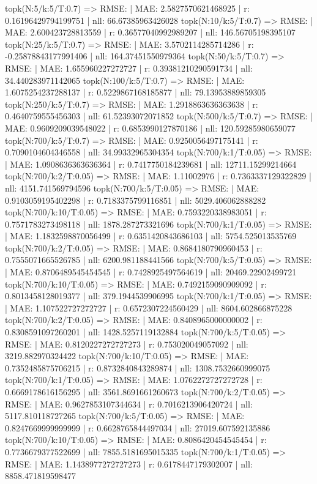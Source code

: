 topk(N:5/k:5/T:0.7) => RMSE: | MAE: 2.5827570621468925 | r: 0.16196429794199751 | nll: 66.67385963426028
topk(N:10/k:5/T:0.7) => RMSE: | MAE: 2.600423728813559 | r: 0.36577040992989207 | nll: 146.56705198395107
topk(N:25/k:5/T:0.7) => RMSE: | MAE: 3.5702114285714286 | r: -0.25878843177991406 | nll: 164.37451550979364
topk(N:50/k:5/T:0.7) => RMSE: | MAE: 1.655960227272727 | r: 0.39381210290591734 | nll: 34.440283971142065
topk(N:100/k:5/T:0.7) => RMSE: | MAE: 1.6075254237288137 | r: 0.5229867168185877 | nll: 79.13953889859305
topk(N:250/k:5/T:0.7) => RMSE: | MAE: 1.2918863636363638 | r: 0.4640759555456303 | nll: 61.52393072071852
topk(N:500/k:5/T:0.7) => RMSE: | MAE: 0.9609209039548022 | r: 0.6853990127870186 | nll: 120.59285980659077
topk(N:700/k:5/T:0.7) => RMSE: | MAE: 0.9250056497175141 | r: 0.7090104604346558 | nll: 34.99332965304354
topk(N:700/k:1/T:0.05) => RMSE: | MAE: 1.0908636363636364 | r: 0.7417750184239681 | nll: 12711.15299214664
topk(N:700/k:2/T:0.05) => RMSE: | MAE: 1.11002976 | r: 0.7363337129322829 | nll: 4151.741569794596
topk(N:700/k:5/T:0.05) => RMSE: | MAE: 0.9103059195402298 | r: 0.7183375799116851 | nll: 5029.406062888282
topk(N:700/k:10/T:0.05) => RMSE: | MAE: 0.7593220338983051 | r: 0.7571783273498118 | nll: 1878.287273321696
topk(N:700/k:1/T:0.05) => RMSE: | MAE: 1.1832598870056499 | r: 0.6351420843686103 | nll: 5754.525013535769
topk(N:700/k:2/T:0.05) => RMSE: | MAE: 0.8684180790960453 | r: 0.7555071665526785 | nll: 6200.981188441566
topk(N:700/k:5/T:0.05) => RMSE: | MAE: 0.8706489545454545 | r: 0.7428925497564619 | nll: 20469.22902499721
topk(N:700/k:10/T:0.05) => RMSE: | MAE: 0.7492159090909092 | r: 0.8013458128019377 | nll: 379.1944539906995
topk(N:700/k:1/T:0.05) => RMSE: | MAE: 1.107522727272727 | r: 0.6572307224560429 | nll: 8604.602866875228
topk(N:700/k:2/T:0.05) => RMSE: | MAE: 0.8408965000000002 | r: 0.8308591097260201 | nll: 1428.5257119132884
topk(N:700/k:5/T:0.05) => RMSE: | MAE: 0.8120227272727273 | r: 0.753020049057092 | nll: 3219.882970324422
topk(N:700/k:10/T:0.05) => RMSE: | MAE: 0.7352485875706215 | r: 0.8732840843289874 | nll: 1308.7532660999075
topk(N:700/k:1/T:0.05) => RMSE: | MAE: 1.0762272727272728 | r: 0.6669178616156295 | nll: 3561.8691661260673
topk(N:700/k:2/T:0.05) => RMSE: | MAE: 0.9627853107344634 | r: 0.7016213906420724 | nll: 5117.810118727265
topk(N:700/k:5/T:0.05) => RMSE: | MAE: 0.8247669999999999 | r: 0.6628765844497034 | nll: 27019.607592135886
topk(N:700/k:10/T:0.05) => RMSE: | MAE: 0.8086420454545454 | r: 0.7736679377522699 | nll: 7855.5181695015335
topk(N:700/k:1/T:0.05) => RMSE: | MAE: 1.1438977272727273 | r: 0.6178447179302007 | nll: 8858.471819598477
